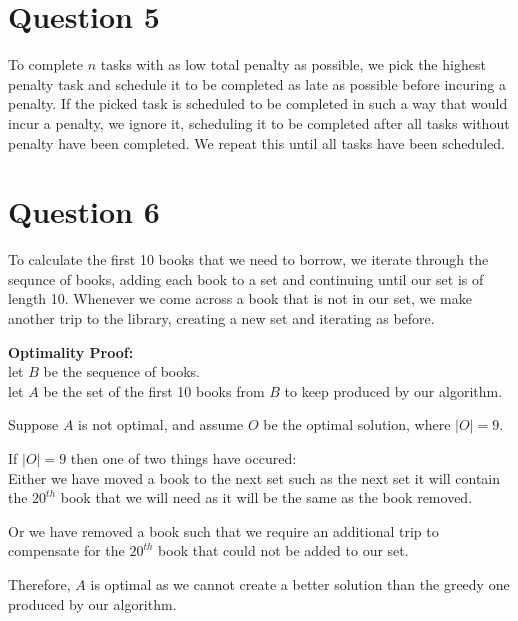 \documentclass{article}
\begin{document}
\section*{Question 5}
To complete $n$ tasks with as low total penalty as possible, we pick the highest penalty task and schedule it to be completed as late as possible before incuring a penalty. If the picked task is scheduled to be completed in such a way that would incur a penalty, we ignore it, scheduling it to be completed after all tasks without penalty have been completed. We repeat this until all tasks have been scheduled.

\section*{Question 6}
To calculate the first 10 books that we need to borrow, we iterate through the sequnce of books, adding each book to a set and continuing until our set is of length 10. Whenever we come across a book that is not in our set, we make another trip to the library, creating a new set and iterating as before.

\textbf{Optimality Proof:}\\
let $B$ be the sequence of books.\\
let $A$ be the set of the first 10 books from $B$ to keep produced by our algorithm.

Suppose $A$ is not optimal, and assume $O$ be the optimal solution, where $|O| = 9$.

If $|O| = 9$ then one of two things have occured:\\

Either we have moved a book to the next set such as the next set it will contain the $20^{th}$ book that we will need as it will be the same as the book removed.

Or we have removed a book such that we require an additional trip to compensate for the $20^{th}$ book that could not be added to our set.

Therefore, $A$ is optimal as we cannot create a better solution than the greedy one produced by our algorithm.
\end{document}
